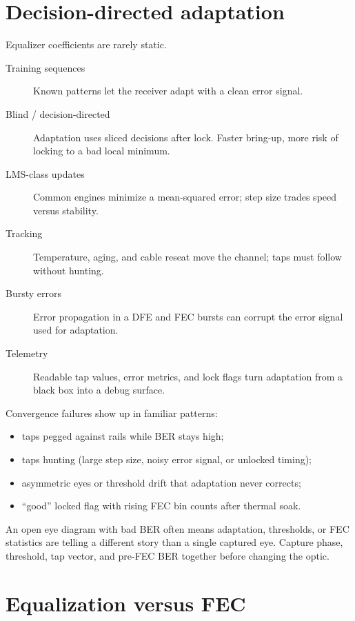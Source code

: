 \section{Decision-directed adaptation}
\label{sec:eq-adaptation}

Equalizer coefficients are rarely static.

\begin{description}
\item[Training sequences] Known patterns let the receiver adapt with a clean
      error signal.
\item[Blind / decision-directed] Adaptation uses sliced decisions after lock.
      Faster bring-up, more risk of locking to a bad local minimum.
\item[LMS-class updates] Common engines minimize a mean-squared error; step size
      trades speed versus stability.
\item[Tracking] Temperature, aging, and cable reseat move the channel; taps must
      follow without hunting.
\item[Bursty errors] Error propagation in a DFE and FEC bursts can corrupt the
      error signal used for adaptation.
\item[Telemetry] Readable tap values, error metrics, and lock flags turn
      adaptation from a black box into a debug surface.
\end{description}

Convergence failures show up in familiar patterns:

\begin{itemize}
\item taps pegged against rails while BER stays high;
\item taps hunting (large step size, noisy error signal, or unlocked timing);
\item asymmetric eyes or threshold drift that adaptation never corrects;
\item ``good'' locked flag with rising FEC bin counts after thermal soak.
\end{itemize}

An open eye diagram with bad BER often means adaptation, thresholds, or FEC
statistics are telling a different story than a single captured eye. Capture
phase, threshold, tap vector, and pre-FEC BER together before changing the
optic.

\section{Equalization versus FEC}
\label{sec:eq-vs-fec}

